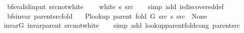 \begin{isabellebody}
\begin{isamarkuptext}
\end{isamarkuptext}\isamarkuptrue%
\isamarkupfalse%
\ {\isacharparenleft}{\kern0pt}\ bfs{\isacharunderscore}{\kern0pt}valid{\isacharunderscore}{\kern0pt}input{\isacharparenright}{\kern0pt}\ src{\isacharunderscore}{\kern0pt}not{\isacharunderscore}{\kern0pt}white{\isacharcolon}{\kern0pt}\isanewline
\ \ \ {\isachardoublequoteopen}{\isasymnot}\ white\ s\ src{\isachardoublequoteclose}\isanewline
%
\isadelimproof
\ \ %
\endisadelimproof
%
\isatagproof
{}\isamarkupfalse%
\ {\isacharparenleft}{\kern0pt}simp\ add{\isacharcolon}{\kern0pt}\ is{\isacharunderscore}{\kern0pt}discovered{\isacharunderscore}{\kern0pt}def{\isacharparenright}{\kern0pt}%
\endisatagproof
{\isafoldproof}%
%
\isadelimproof
\isanewline
%
\endisadelimproof
\isanewline
{}\isamarkupfalse%
\ {\isacharparenleft}{\kern0pt}\ bfs{\isacharunderscore}{\kern0pt}invar{\isacharparenright}{\kern0pt}\ parent{\isacharunderscore}{\kern0pt}src{\isacharunderscore}{\kern0pt}fold{\isacharcolon}{\kern0pt}\isanewline
\ \ \ {\isachardoublequoteopen}P{\isacharunderscore}{\kern0pt}lookup\ {\isacharparenleft}{\kern0pt}parent\ {\isacharparenleft}{\kern0pt}fold\ G\ src\ s{\isacharparenright}{\kern0pt}{\isacharparenright}{\kern0pt}\ src\ {\isacharequal}{\kern0pt}\ None{\isachardoublequoteclose}\isanewline
%
\isadelimproof
\ \ %
\endisadelimproof
%
\isatagproof
{}\isamarkupfalse%
\ invar{\isacharunderscore}{\kern0pt}G\ invar{\isacharunderscore}{\kern0pt}parent\ src{\isacharunderscore}{\kern0pt}not{\isacharunderscore}{\kern0pt}white\isanewline
\ \ \isamarkupfalse%
\ {\isacharparenleft}{\kern0pt}simp\ add{\isacharcolon}{\kern0pt}\ lookup{\isacharunderscore}{\kern0pt}parent{\isacharunderscore}{\kern0pt}fold{\isacharunderscore}{\kern0pt}cong{\isacharunderscore}{\kern0pt}{}\ parent{\isacharunderscore}{\kern0pt}src{\isacharparenright}{\kern0pt}%
\endisatagproof
{\isafoldproof}%
%
\isadelimproof
%
\endisadelimproof
%
\begin{isamarkuptext}%

\end{isamarkuptext}
\end{isabellebody}
